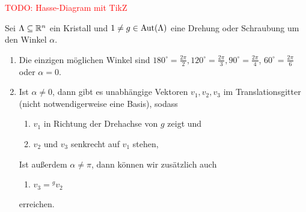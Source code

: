 \textcolor{red}{TODO: Hasse-Diagram mit TikZ}



\begin{theorem}
Sei $\Lambda\subseteq\mathbb{R}^n$ ein Kristall und $1\neq g\in\operatorname{Aut}(\Lambda)$ eine Drehung oder Schraubung um den Winkel $\alpha$.
\begin{enumerate}
\item Die einzigen möglichen Winkel sind $180^\circ=\frac{2\pi}{2}, 120^\circ= \frac{2\pi}{3}, 90^\circ=\frac{2\pi}{4}$, $60^\circ=\frac{2\pi}{6}$ oder $\alpha=0$.
\item Ist $\alpha\neq 0$, dann gibt es unabhängige Vektoren $v_1,v_2,v_3$ im Translationsgitter (nicht notwendigerweise eine Basis), sodass
\begin{enumerate}
\item $v_1$ in Richtung der Drehachse von $g$ zeigt und
\item $v_2$ und $v_3$ senkrecht auf $v_1$ stehen,
\end{enumerate}
Ist außerdem $\alpha\neq\pi$, dann können wir zusätzlich auch
\begin{enumerate}[resume]
\item $v_3={^g v_2}$
\end{enumerate}
erreichen.
\end{enumerate}
\end{theorem}
